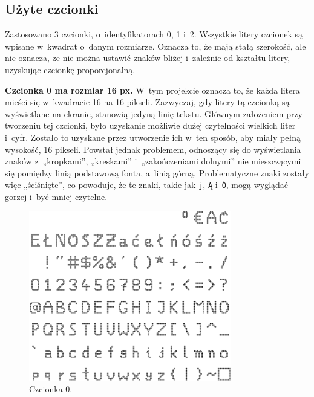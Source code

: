 \subsection{Użyte czcionki}
Zastosowano 3 czcionki, o~identyfikatorach 0, 1 i~2. Wszystkie litery czcionek są wpisane w~kwadrat o~danym rozmiarze. Oznacza to, że mają stałą szerokość, ale nie oznacza, ze nie można ustawić znaków bliżej i~zależnie od kształtu litery, uzyskując czcionkę proporcjonalną.

\textbf{Czcionka 0 ma rozmiar 16 px.} W~tym projekcie oznacza to, że każda litera mieści się w~kwadracie 16 na 16 pikseli. Zazwyczaj, gdy litery tą czcionką są wyświetlane na ekranie, stanowią jedyną linię tekstu. Głównym założeniem przy tworzeniu tej czcionki, było uzyskanie możliwie dużej czytelności wielkich liter i~cyfr. Zostało to uzyskane przez utworzenie ich w~ten sposób, aby miały pełną wysokość, 16 pikseli. Powstał jednak problemem, odnoszący się do wyświetlania znaków z~„kropkami”, „kreskami” i~„zakończeniami dolnymi” nie mieszczącymi się pomiędzy linią podstawową fonta, a~linią górną. Problematyczne znaki zostały więc „ściśnięte”, co powoduje, że te znaki, takie jak \texttt{j}, \texttt{Ą} i~\texttt{Ó}, mogą wyglądać gorzej i~być mniej czytelne. 
\begin{figure}[htb]
	\begin{center}
		\includegraphics[width=250pt]{figures/czcionka0-praca.png}
	\end{center}
	\caption{Czcionka 0.}
\end{figure}

